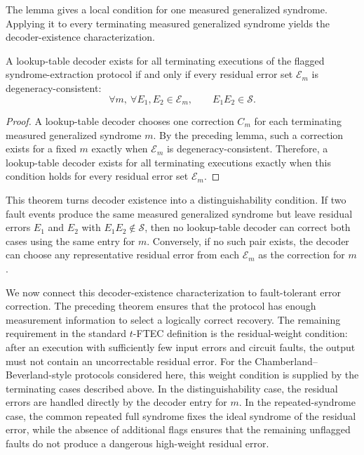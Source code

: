 \documentclass[acmsmall,screen,review,anonymous,nonacm]{acmart}
\begin{document}
The lemma gives a local condition for one measured generalized syndrome. Applying it to every terminating measured generalized syndrome yields the decoder-existence characterization.

\begin{theorem}\label{thm:decoder}
A lookup-table decoder exists for all terminating executions of the flagged syndrome-extraction protocol if and only if every residual error set $\mathcal{E}_m$ is degeneracy-consistent:
\[
  \forall m,\ \forall E_1,E_2\in\mathcal{E}_m,\qquad E_1E_2\in\mathcal{S}.
\]
\end{theorem}

\begin{proof}
A lookup-table decoder chooses one correction $C_m$ for each terminating measured generalized syndrome $m$. By the preceding lemma, such a correction exists for a fixed $m$ exactly when $\mathcal{E}_m$ is degeneracy-consistent. Therefore, a lookup-table decoder exists for all terminating executions exactly when this condition holds for every residual error set $\mathcal{E}_m$.
\end{proof}

This theorem turns decoder existence into a distinguishability condition. If two fault events produce the same measured generalized syndrome but leave residual errors $E_1$ and $E_2$ with $E_1E_2\notin\mathcal{S}$, then no lookup-table decoder can correct both cases using the same entry for $m$. Conversely, if no such pair exists, the decoder can choose any representative residual error from each $\mathcal{E}_m$ as the correction for $m$.

We now connect this decoder-existence characterization to fault-tolerant error correction. The preceding theorem ensures that the protocol has enough measurement information to select a logically correct recovery. The remaining requirement in the standard $t$-FTEC definition is the residual-weight condition: after an execution with sufficiently few input errors and circuit faults, the output must not contain an uncorrectable residual error. For the Chamberland--Beverland-style protocols considered here, this weight condition is supplied by the terminating cases described above. In the distinguishability case, the residual errors are handled directly by the decoder entry for $m$. In the repeated-syndrome case, the common repeated full syndrome fixes the ideal syndrome of the residual error, while the absence of additional flags ensures that the remaining unflagged faults do not produce a dangerous high-weight residual error.
\end{document}
